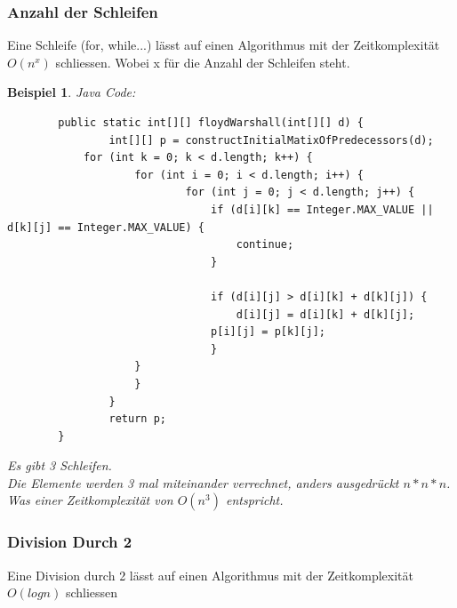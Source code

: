 \documentclass[a4paper,10pt]{report}
\newtheorem{myexample}{Beispiel}
\begin{document}
 \subsubsection{Anzahl der  Schleifen}
 Eine Schleife (for, while...) lässt auf einen Algorithmus mit der Zeitkomplexität $O(n^x)$ schliessen.
 Wobei x für die Anzahl der Schleifen steht.
 \begin{myexample}
 	Java Code:
 	\begin{lstlisting}
 		public static int[][] floydWarshall(int[][] d) {
    			int[][] p = constructInitialMatixOfPredecessors(d);
  		 	for (int k = 0; k < d.length; k++) {
       				for (int i = 0; i < d.length; i++) {
            				for (int j = 0; j < d.length; j++) {
                				if (d[i][k] == Integer.MAX_VALUE || d[k][j] == Integer.MAX_VALUE) {
                    				continue;                  
                				}
                
               					if (d[i][j] > d[i][k] + d[k][j]) {
                    				d[i][j] = d[i][k] + d[k][j];
                   		 		p[i][j] = p[k][j];
                				}
					}
        			}
    			}
    			return p;
		}
 	\end{lstlisting}
 	Es gibt 3 Schleifen.\\
 	Die Elemente werden 3 mal miteinander verrechnet, anders ausgedrückt $n*n*n$. Was einer Zeitkomplexität von $O(n^3)$ entspricht.
 \end{myexample}
 \subsubsection{Division Durch 2}
 Eine Division durch 2 lässt auf einen Algorithmus mit der Zeitkomplexität $O(log n)$ schliessen
\end{document}
